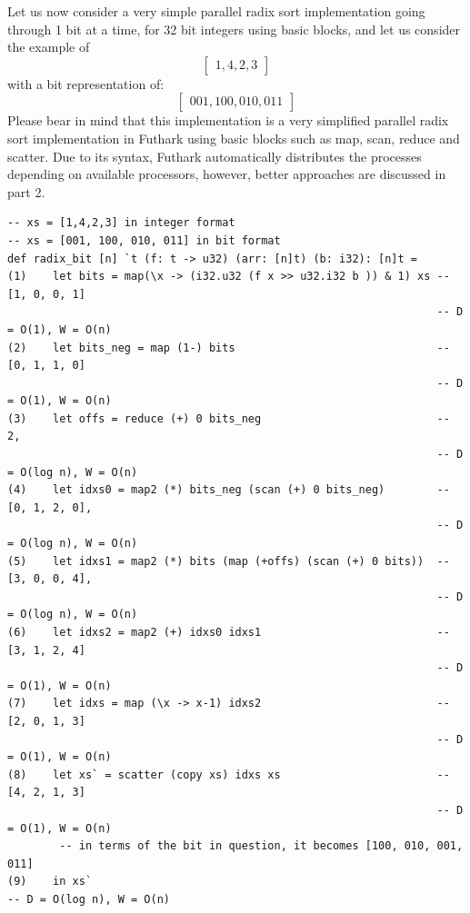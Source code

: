 \documentclass{article}
\begin{document}
\begin{itemize}
Let us now consider a very simple parallel radix sort implementation going through 1 bit at a time, for 32 bit integers using basic blocks, and let us consider the example of
$$\begin{bmatrix} 1, 4, 2, 3\end{bmatrix}$$
with a bit representation of: 
$$\begin{bmatrix} 001, 100, 010, 011\end{bmatrix}$$
Please bear in mind that this implementation is a very simplified parallel radix sort implementation in Futhark using basic blocks such as map, scan, reduce and scatter. Due to its syntax, Futhark automatically distributes the processes depending on available processors, however, better approaches are discussed in part 2. 
\begin{lstlisting}
-- xs = [1,4,2,3] in integer format
-- xs = [001, 100, 010, 011] in bit format 
def radix_bit [n] `t (f: t -> u32) (arr: [n]t) (b: i32): [n]t =
(1)    let bits = map(\x -> (i32.u32 (f x >> u32.i32 b )) & 1) xs -- [1, 0, 0, 1]
                                                                  -- D = O(1), W = O(n)
(2)    let bits_neg = map (1-) bits                               -- [0, 1, 1, 0]
                                                                  -- D = O(1), W = O(n)
(3)    let offs = reduce (+) 0 bits_neg                           -- 2, 
                                                                  -- D = O(log n), W = O(n)
(4)    let idxs0 = map2 (*) bits_neg (scan (+) 0 bits_neg)        -- [0, 1, 2, 0],
                                                                  -- D = O(log n), W = O(n)
(5)    let idxs1 = map2 (*) bits (map (+offs) (scan (+) 0 bits))  -- [3, 0, 0, 4], 
                                                                  -- D = O(log n), W = O(n)
(6)    let idxs2 = map2 (+) idxs0 idxs1                           -- [3, 1, 2, 4]
                                                                  -- D = O(1), W = O(n)
(7)    let idxs = map (\x -> x-1) idxs2                           -- [2, 0, 1, 3]
                                                                  -- D = O(1), W = O(n)
(8)    let xs` = scatter (copy xs) idxs xs                        -- [4, 2, 1, 3]
                                                                  -- D = O(1), W = O(n)
        -- in terms of the bit in question, it becomes [100, 010, 001, 011]
(9)    in xs`                                                                                                                                -- D = O(log n), W = O(n)


\end{lstlisting}
\end{itemize}
\end{document}
